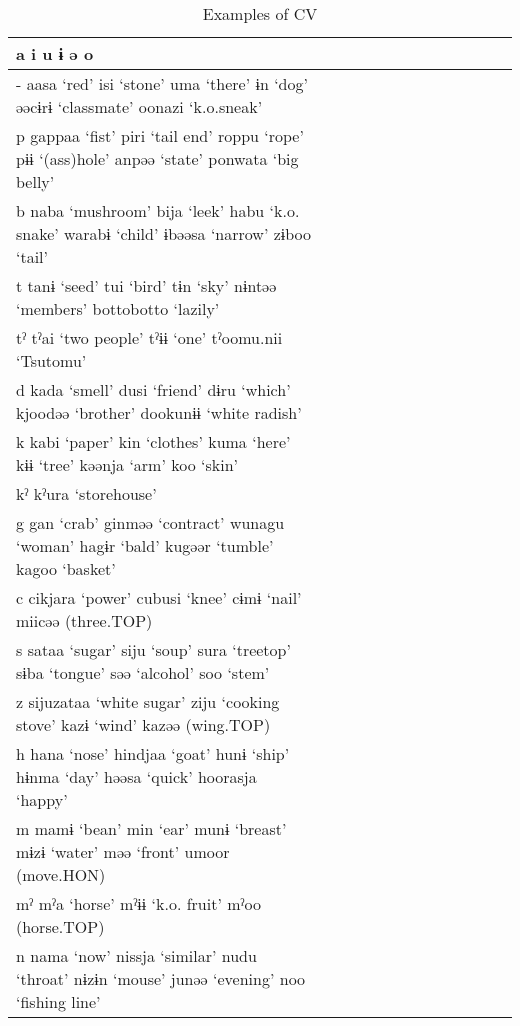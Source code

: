 \begin{sidewaystable}
\caption{Examples of CV}
\begin{tabular}{lllllllllllll} 
\lsptoprule
 {a}    {i}    {u}    {ɨ}    {ə}    {o}  \\\midrule
{{}-}  {aasa}  {‘red’}  {isi}  {‘stone’}  {uma}  {‘there’}  {ɨn}  {‘dog’}  {əəcɨrɨ}  {‘classmate’}  {oonazi}  {‘k.o.sneak’}\\
{p}  {gappaa}  {‘fist’}  {piri}  {‘tail end’}  {roppu}  {‘rope’}  {pɨɨ}  {‘(ass)hole’}  {anpəə}  {‘state’}  {ponwata}  {‘big belly’}\\
{b}  {naba}  {‘mushroom’}  {bija}  {‘leek’}  {habu}  {‘k.o. snake’}  {warabɨ}  {‘child’}  {ɨbəəsa}  {‘narrow’}  {zɨboo}  {‘tail’}\\
{t}  {tanɨ}  {‘seed’}      {tui}  {‘bird’}  {tɨn}  {‘sky’}  {nɨntəə}  {‘members’}  {bottobotto}  {‘lazily’}\\
{tˀ}  {tˀai}  {‘two people’}          {tˀɨɨ}  {‘one’}      {tˀoomu.nii}  {‘Tsutomu’}\\
{d}  {kada}  {‘smell’}      {dusi}  {‘friend’}  {dɨru}  {‘which’}  {kjoodəə}  {‘brother’}  {dookunɨɨ}  {‘white radish’}\\
{k}  {kabi}  {‘paper’}  {kin}  {‘clothes’}  {kuma}  {‘here’}  {kɨɨ}  {‘tree’}  {kəənja}  {‘arm’}  {koo}  {‘skin’}\\
{kˀ}          {kˀura}  {‘storehouse’}            \\
{g}  {gan}  {‘crab’}  {ginməə}  {‘contract’}  {wunagu}  {‘woman’}  {hagɨr}  {‘bald’}  {kugəər}  {‘tumble’}  {kagoo}  {‘basket’}\\
{c}      {cikjara}  {‘power’}  {cubusi}  {‘knee’}  {cɨmɨ}  {‘nail’}  {miicəə}  {(three.TOP)}    \\
{s}  {sataa}  {‘sugar’}  {siju}  {‘soup’}  {sura}  {‘treetop’}  {sɨba}  {‘tongue’}  {səə}  {‘alcohol’}  {soo}  {‘stem’}\\
{z}  {sijuzataa}  {‘white sugar’}  {ziju}  {‘cooking stove’}      {kazɨ}  {‘wind’}  {kazəə}  {(wing.TOP)}    \\
{h}  {hana}  {‘nose’}  {hindjaa}  {‘goat’}  {hunɨ}  {‘ship’}  {hɨnma}  {‘day’}  {həəsa}  {‘quick’}  {hoorasja}  {‘happy’}\\
{m}  {mamɨ}  {‘bean’}  {min}  {‘ear’}  {munɨ}  {‘breast’}  {mɨzɨ}  {‘water’}  {məə}  {‘front’}  {umoor}  {(move.HON)}\\
{mˀ}  {mˀa}  {‘horse’}          {mˀɨɨ}  {‘k.o. fruit’}      {mˀoo}  {(horse.TOP)}\\
{n}  {nama}  {‘now’}  {nissja}  {‘similar’}  {nudu}  {‘throat’}  {nɨzɨn}  {‘mouse’}  {junəə}  {‘evening’}  {noo}  {‘fishing line’}\\

\end{tabular}
\end{sidewaystable}
